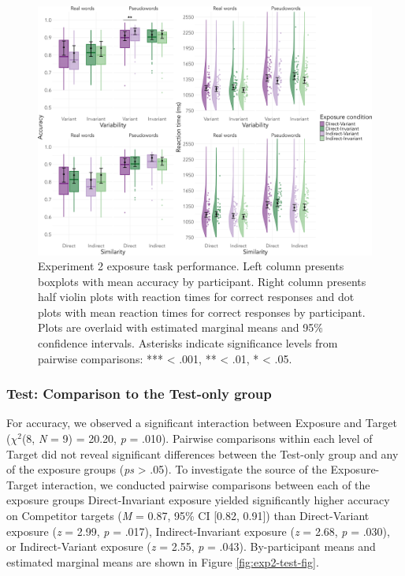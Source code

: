 \documentclass[preprint, 3p, authoryear]{elsarticle} %
\begin{document}
\begin{figure}

{\centering \includegraphics[width=\textwidth]{sections/code/outputs/plot_exp_1b} 

}

\caption{Experiment 2 exposure task performance. Left column presents boxplots with mean accuracy by participant. Right column presents half violin plots with reaction times for correct responses and dot plots with mean reaction times for correct responses by participant. Plots are overlaid with estimated marginal means and 95\% confidence intervals. Asterisks indicate significance levels from pairwise comparisons: *** < .001, ** < .01, * < .05.}\label{fig:exp2-exp-fig}
\end{figure}

\hypertarget{test-comparison-to-the-test-only-group-1}{%
\subsubsection{Test: Comparison to the Test-only group}\label{test-comparison-to-the-test-only-group-1}}

For accuracy, we observed a significant interaction between Exposure and Target (\(\chi^2\)(8, \emph{N} = 9) = 20.20, \emph{p} = .010).
Pairwise comparisons within each level of Target did not reveal significant differences between the Test-only group and any of the exposure groups (\emph{ps} \textgreater{} .05).
To investigate the source of the Exposure-Target interaction, we conducted pairwise comparisons between each of the exposure groups
Direct-Invariant exposure yielded significantly higher accuracy on Competitor targets (\emph{M} = 0.87, 95\% CI {[}0.82, 0.91{]}) than Direct-Variant exposure (\emph{z} = 2.99, \emph{p} = .017), Indirect-Invariant exposure (\emph{z} = 2.68, \emph{p} = .030), or Indirect-Variant exposure (\emph{z} = 2.55, \emph{p} = .043).
By-participant means and estimated marginal means are shown in Figure \ref{fig:exp2-test-fig}.
\end{document}
